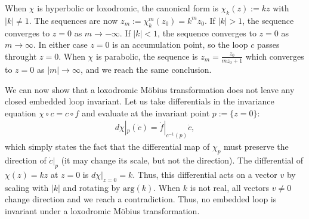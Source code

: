 When $\chi$ 
is hyperbolic or loxodromic, the canonical form is
$\chi_k(z) := k z$ with $|k| \neq 1$. The sequences are now 
$z_m := \chi_k^m (z_0) =  k^m z_0$. If $|k| > 1$, the 
sequence converges to $z=0$ as $m \rightarrow -\infty$. If 
$|k| <1$, the sequence converges to $z=0$ as $m \rightarrow \infty$. In either
case $z=0$ is an accumulation point, so the loop $c$ passes throught $z=0$.
When $\chi$ is parabolic, the sequence is
$z_m = \frac{z_0}{m z_0 + 1 }$ which converges to $z=0$ as $|m| \rightarrow 
\infty$, and we reach the same conclusion.

We can now show that a loxodromic M\"obius transformation does not leave
any closed embedded loop invariant. Let us take differentials in the
invariance equation $\chi \circ c = c \circ f$ and evaluate at
the invariant point $p := \{ z=0\}$:
\begin{align*}
d \chi |_p (\dot c) = \dot{f} |_{c^{-1} (p)} \dot{c},
\end{align*}
which simply states the fact that
the differential map of $\chi_p$ must 
preserve the direction of $\dot{c}|_p$ (it may change its scale, but not 
the direction). The differential of $\chi(z)= k z$ at $z=0$
is  $d \chi |_{z=0} = k$. Thus, this differential
acts on a vector $v$ by scaling with $|k|$ and rotating by $\mbox{arg} (k)$.
When $k$ is not real, all vectors $v \neq 0$ change direction and
we reach  a contradiction. Thus, no embedded loop is invariant
under a  loxodromic M\"obius transformation.

